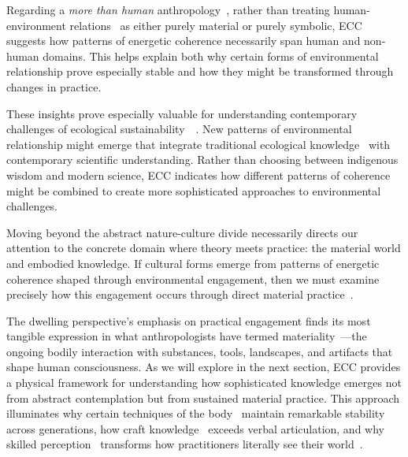 Regarding a \textit{more than human} anthropology~\cite{kohn2013how,tsing2015mushroom}, rather than treating human-environment relations~ as either purely material or purely symbolic, ECC suggests how patterns of energetic coherence necessarily span human and non-human domains. This helps explain both why certain forms of environmental relationship prove especially stable and how they might be transformed through changes in practice.

These insights prove especially valuable for understanding contemporary challenges of ecological sustainability~~\cite{viveiros2014cannibal,haraway2016staying}. New patterns of environmental relationship might emerge that integrate traditional ecological knowledge~ with contemporary scientific understanding. Rather than choosing between indigenous wisdom and modern science, ECC indicates how different patterns of coherence might be combined to create more sophisticated approaches to environmental challenges.

Moving beyond the abstract nature-culture divide necessarily directs our attention to the concrete domain where theory meets practice: the material world and embodied knowledge. If cultural forms emerge from patterns of energetic coherence shaped through environmental engagement, then we must examine precisely how this engagement occurs through direct material practice~\cite{ingold2011being,warnier2001praxeological}.

The dwelling perspective's emphasis on practical engagement finds its most tangible expression in what anthropologists have termed materiality~—the ongoing bodily interaction with substances, tools, landscapes, and artifacts that shape human consciousness. As we will explore in the next section, ECC provides a physical framework for understanding how sophisticated knowledge emerges not from abstract contemplation but from sustained material practice. This approach illuminates why certain techniques of the body~ maintain remarkable stability across generations, how craft knowledge~ exceeds verbal articulation, and why skilled perception~ transforms how practitioners literally see their world~\cite{mauss1973techniques,csordas1990embodiment,goodwin1994professional}.
